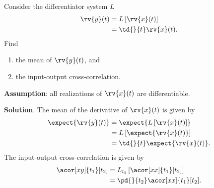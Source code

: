 \begin{example}[Differentiator]
    Consider the differentiator system $L$
    \begin{align}
        \rv{y}(t) &= L\left[ \rv{x}(t) \right]\\
        &= \td{}{t}\rv{x}(t).
    \end{align}
    Find
    \begin{enumerate}
        \item the mean of $\rv{y}(t)$, and
        \item the input-output cross-correlation.
    \end{enumerate}
    \textbf{Assumption}: all realizations of $\rv{x}(t)$ are differentiable.

    \textbf{Solution}. The mean of the derivative of $\rv{x}(t)$ is given by
    \begin{align}
        \expect{\rv{y}(t)} &= \expect{L\left[ \rv{x}(t) \right]}\\
        &= L\left[ \expect{ \rv{x}(t)} \right]\\
        &= \td{}{t}\expect{\rv{x}(t)}.
    \end{align}
    The input-output cross-correlation is given by
    \begin{align}
        \acor[xy]{t_{1}}[t_{2}] &= L_{t_{2}}\left[ \acor[xx]{t_{1}}[t_{2}] \right]\\
        &= \pd{}{t_{2}}\acor[xx]{t_{1}}[t_{2}].
    \end{align}
\end{example}


